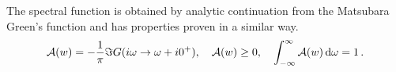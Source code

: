 \documentclass[11pt]{article}
\begin{document}
The spectral function is obtained by analytic continuation from the Matsubara Green's function and has properties proven in a similar way.
%
\begin{equation}
\mathcal{A}(w) = -\frac{1}{\pi} \Im{G(i\omega \rightarrow \omega + i0^+)},
\quad
\mathcal{A}(w) \geq 0,
\quad
\int_{-\infty}^{\infty} \mathcal{A}(w) \dif \omega = 1
\, .
\end{equation}
%












\end{document}
